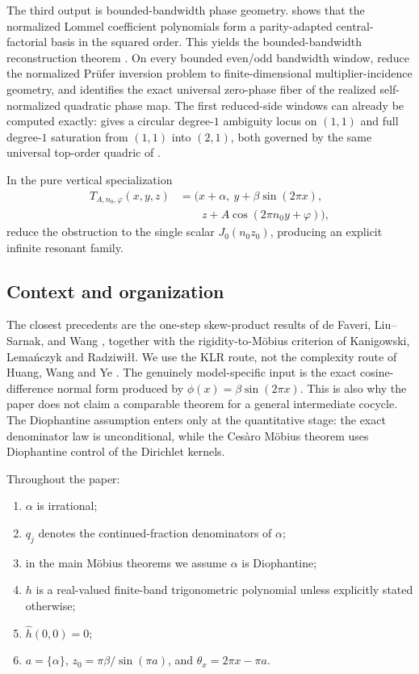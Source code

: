 \documentclass[11pt,reqno]{amsart}
\theoremstyle{definition}
\newcommand{\qj}{q_j}
\begin{document}
The third output is bounded-bandwidth phase geometry.  shows that the
normalized Lommel coefficient polynomials form a parity-adapted central-factorial basis in the
squared order. This yields the bounded-bandwidth reconstruction theorem
. On every bounded even/odd bandwidth window,
 reduce the
normalized Pr\"ufer inversion problem to finite-dimensional multiplier-incidence geometry, and
 identifies the exact universal zero-phase fiber of the realized
self-normalized quadratic phase map. The first reduced-side windows can already be computed
exactly:  gives a circular degree-$1$ ambiguity locus on
$(1,1)$ and full degree-$1$ saturation from $(1,1)$ into $(2,1)$, both governed by the same
universal top-order quadric of .

In the pure vertical specialization
\[
\begin{aligned}
T_{A,n_0,\varphi}(x,y,z)
&=(x+\alpha,\ y+\beta\sin(2\pi x),\\
&\qquad z+A\cos(2\pi n_0 y+\varphi)),
\end{aligned}
\]
 reduce the obstruction to the single scalar
$J_0(n_0z_0)$, producing an explicit infinite resonant family.

\subsection{Context and organization}

The closest precedents are the one-step skew-product results of de Faveri, Liu--Sarnak, and Wang
\cite{deFaveri,LiuSarnak,WangAnalytic}, together with the rigidity-to-M\"obius criterion of
Kanigowski, Lema\'nczyk and Radziwi\l\l \cite{KLR}. We use the KLR route, not the
complexity route of Huang, Wang and Ye \cite{HWY}. The genuinely model-specific input is the exact
cosine-difference normal form produced by $\phi(x)=\beta\sin(2\pi x)$. This is also why the
paper does not claim a comparable theorem for a general intermediate cocycle. The Diophantine
assumption enters only at the quantitative stage: the exact denominator law is unconditional,
while the Ces\`aro M\"obius theorem uses Diophantine control of the Dirichlet kernels.

Throughout the paper:
\begin{enumerate}[label=\arabic*.]
\item $\alpha$ is irrational;
\item $\qj$ denotes the continued-fraction denominators of $\alpha$;
\item in the main M\"obius theorems we assume $\alpha$ is Diophantine;
\item $h$ is a real-valued finite-band trigonometric polynomial unless explicitly stated
otherwise;
\item $\widehat h(0,0)=0$;
\item $a=\{\alpha\}$, $z_0=\pi\beta/\sin(\pi a)$, and $\theta_x=2\pi x-\pi a$.
\end{enumerate}
\end{document}

